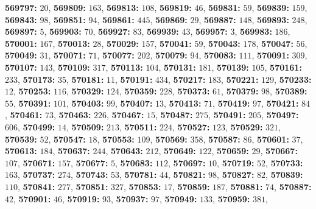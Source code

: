 \textsf{\bfseries 569797:} $20$, \textsf{\bfseries 569809:} $163$, \textsf{\bfseries 569813:} $108$, \textsf{\bfseries 569819:} $46$, \textsf{\bfseries 569831:} $59$, \textsf{\bfseries 569839:} $159$, \textsf{\bfseries 569843:} $98$, \textsf{\bfseries 569851:} $94$, \textsf{\bfseries 569861:} $445$, \textsf{\bfseries 569869:} $29$, \textsf{\bfseries 569887:} $148$, \textsf{\bfseries 569893:} $248$, \textsf{\bfseries 569897:} $5$, \textsf{\bfseries 569903:} $70$, \textsf{\bfseries 569927:} $83$, \textsf{\bfseries 569939:} $43$, \textsf{\bfseries 569957:} $3$, \textsf{\bfseries 569983:} $186$, \textsf{\bfseries 570001:} $167$, \textsf{\bfseries 570013:} $28$, \textsf{\bfseries 570029:} $157$, \textsf{\bfseries 570041:} $59$, \textsf{\bfseries 570043:} $178$, \textsf{\bfseries 570047:} $56$, \textsf{\bfseries 570049:} $31$, \textsf{\bfseries 570071:} $71$, \textsf{\bfseries 570077:} $202$, \textsf{\bfseries 570079:} $94$, \textsf{\bfseries 570083:} $111$, \textsf{\bfseries 570091:} $309$, \textsf{\bfseries 570107:} $143$, \textsf{\bfseries 570109:} $317$, \textsf{\bfseries 570113:} $104$, \textsf{\bfseries 570131:} $181$, \textsf{\bfseries 570139:} $105$, \textsf{\bfseries 570161:} $233$, \textsf{\bfseries 570173:} $35$, \textsf{\bfseries 570181:} $11$, \textsf{\bfseries 570191:} $434$, \textsf{\bfseries 570217:} $183$, \textsf{\bfseries 570221:} $129$, \textsf{\bfseries 570233:} $12$, \textsf{\bfseries 570253:} $116$, \textsf{\bfseries 570329:} $124$, \textsf{\bfseries 570359:} $228$, \textsf{\bfseries 570373:} $61$, \textsf{\bfseries 570379:} $98$, \textsf{\bfseries 570389:} $55$, \textsf{\bfseries 570391:} $101$, \textsf{\bfseries 570403:} $99$, \textsf{\bfseries 570407:} $13$, \textsf{\bfseries 570413:} $71$, \textsf{\bfseries 570419:} $97$, \textsf{\bfseries 570421:} $84$, \textsf{\bfseries 570461:} $73$, \textsf{\bfseries 570463:} $226$, \textsf{\bfseries 570467:} $15$, \textsf{\bfseries 570487:} $275$, \textsf{\bfseries 570491:} $205$, \textsf{\bfseries 570497:} $606$, \textsf{\bfseries 570499:} $14$, \textsf{\bfseries 570509:} $213$, \textsf{\bfseries 570511:} $224$, \textsf{\bfseries 570527:} $123$, \textsf{\bfseries 570529:} $321$, \textsf{\bfseries 570539:} $52$, \textsf{\bfseries 570547:} $18$, \textsf{\bfseries 570553:} $109$, \textsf{\bfseries 570569:} $358$, \textsf{\bfseries 570587:} $86$, \textsf{\bfseries 570601:} $37$, \textsf{\bfseries 570613:} $184$, \textsf{\bfseries 570637:} $244$, \textsf{\bfseries 570643:} $212$, \textsf{\bfseries 570649:} $122$, \textsf{\bfseries 570659:} $29$, \textsf{\bfseries 570667:} $107$, \textsf{\bfseries 570671:} $157$, \textsf{\bfseries 570677:} $5$, \textsf{\bfseries 570683:} $112$, \textsf{\bfseries 570697:} $10$, \textsf{\bfseries 570719:} $52$, \textsf{\bfseries 570733:} $163$, \textsf{\bfseries 570737:} $274$, \textsf{\bfseries 570743:} $53$, \textsf{\bfseries 570781:} $44$, \textsf{\bfseries 570821:} $98$, \textsf{\bfseries 570827:} $82$, \textsf{\bfseries 570839:} $110$, \textsf{\bfseries 570841:} $277$, \textsf{\bfseries 570851:} $327$, \textsf{\bfseries 570853:} $17$, \textsf{\bfseries 570859:} $187$, \textsf{\bfseries 570881:} $74$, \textsf{\bfseries 570887:} $42$, \textsf{\bfseries 570901:} $46$, \textsf{\bfseries 570919:} $93$, \textsf{\bfseries 570937:} $97$, \textsf{\bfseries 570949:} $133$, \textsf{\bfseries 570959:} $381$, 
